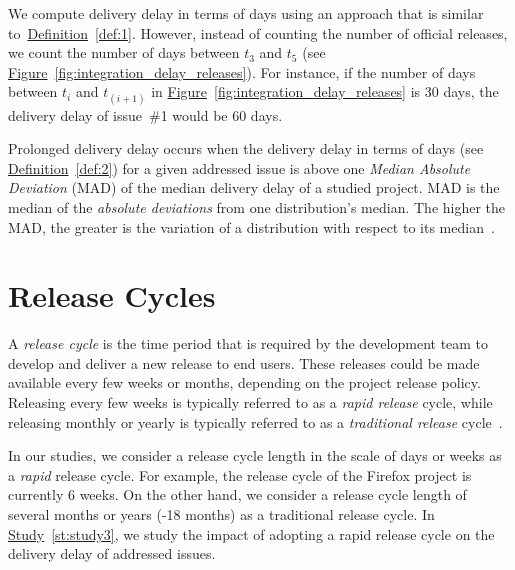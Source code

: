  We compute delivery delay in
terms of days using an approach that is similar
to~\hyperref[def:1]{Definition}~\ref{def:1}. However, instead of counting the
number of official releases, we count the number of days between {$t_3$} and
{$t_5$} (see
\hyperref[fig:integration_delay_releases]{Figure}~\ref{fig:integration_delay_releases}).
For instance, if the number of days between $t_i$ and $t_{(i+1)}$ in
\hyperref[fig:integration_delay_releases]{Figure}~\ref{fig:integration_delay_releases}
is 30 days, the delivery delay of issue~\#1 would be 60 days.

 Prolonged delivery delay occurs when the
delivery delay in terms of days (see \hyperref[def:2]{Definition}~\ref{def:2})
for a given addressed issue is above one {\em Median Absolute Deviation} (MAD)
of the median delivery delay of a studied project. MAD is the median of the
\textit{absolute deviations} from one distribution's median. The higher the MAD,
the greater is the variation of a distribution with respect to its
median~\cite{howell2005median,leys2013detecting}.

\section{Release Cycles} \label{subsec:firefox_releases}
\DIFdelbegin %

\DIFdelend 

A {\em release cycle} is the time period that is required by the development
team to develop and deliver a new release to end users. These releases could be
made available every few weeks or months, depending on the project release
policy. Releasing every few weeks is typically referred to as a \textit{rapid
release} cycle, while releasing monthly or yearly is typically referred to as a
\textit{traditional release} cycle~\cite{Mantyla2013}.

In our studies, we consider a release cycle length in the scale of days or weeks
as a {\em rapid} release cycle. For example, the release cycle of the Firefox
project is currently 6
weeks.
On the other hand, we consider a release cycle length of  several months or
years (-18 months) as a traditional release cycle. In
\hyperref[st:study3]{Study}~\ref{st:study3}, we study the impact of adopting a
rapid release cycle on the delivery delay of addressed issues.

